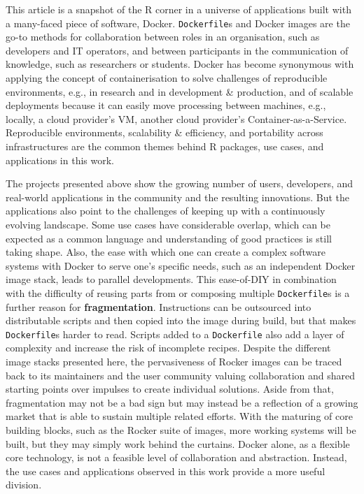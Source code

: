 This article is a snapshot of the R corner in a universe of applications
built with a many-faced piece of software, Docker. \texttt{Dockerfile}s
and Docker images are the go-to methods for collaboration between roles
in an organisation, such as developers and IT operators, and between
participants in the communication of knowledge, such as researchers or
students. Docker has become synonymous with applying the concept of
containerisation to solve challenges of reproducible environments, e.g.,
in research and in development \& production, and of scalable
deployments because it can easily move processing between machines,
e.g., locally, a cloud provider's VM, another cloud provider's
Container-as-a-Service. Reproducible environments, scalability \&
efficiency, and portability across infrastructures are the common themes
behind R packages, use cases, and applications in this work.

The projects presented above show the growing number of users,
developers, and real-world applications in the community and the
resulting innovations. But the applications also point to the challenges
of keeping up with a continuously evolving landscape. Some use cases
have considerable overlap, which can be expected as a common language
and understanding of good practices is still taking shape. Also, the
ease with which one can create a complex software systems with Docker to
serve one's specific needs, such as an independent Docker image stack,
leads to parallel developments. This ease-of-DIY in combination with the
difficulty of reusing parts from or composing multiple
\texttt{Dockerfile}s is a further reason for \textbf{fragmentation}.
Instructions can be outsourced into distributable scripts and then
copied into the image during build, but that makes \texttt{Dockerfile}s
harder to read. Scripts added to a \texttt{Dockerfile} also add a layer
of complexity and increase the risk of incomplete recipes. Despite the
different image stacks presented here, the pervasiveness of Rocker
images can be traced back to its maintainers and the user community
valuing collaboration and shared starting points over impulses to create
individual solutions. Aside from that, fragmentation may not be a bad
sign but may instead be a reflection of a growing market that is able to
sustain multiple related efforts. With the maturing of core building
blocks, such as the Rocker suite of images, more working systems will be
built, but they may simply work behind the curtains. Docker alone, as a
flexible core technology, is not a feasible level of collaboration and
abstraction. Instead, the use cases and applications observed in this
work provide a more useful division.

